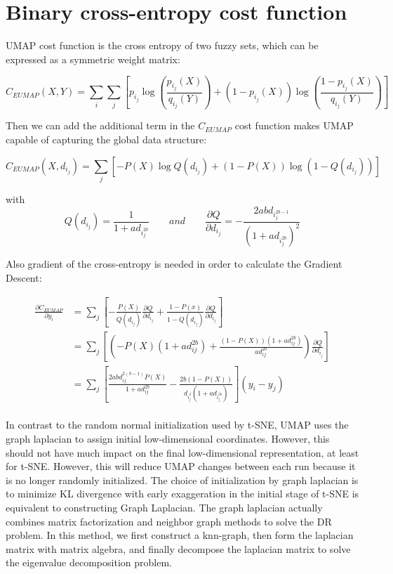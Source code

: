 \section{Binary cross-entropy cost function}

UMAP cost function is the cross entropy of two fuzzy sets, which can be expressed as a symmetric weight matrix:

\begin{equation*}
    C_{EUMAP}(X,Y) = \sum_{i} \sum _{j}[p_i_j \log(\frac{p_i_j(X)}{q_i_j(Y)}) + (1-p_i_j(X))\log (\frac{1-p_i_j(X)}{q_i_j(Y)})]
\end{equation*}

\noindent Then we can add the additional term in the $C_{EUMAP}$ cost function makes UMAP capable of capturing the global data structure:

\begin{equation*}
    C_{EUMAP}(X,d_i_j) = \sum _{j}[-P(X) \log Q(d_i_j) + (1 - P(X)) \log (1-Q(d_i_j))]
\end{equation*}

with \begin{equation*}
    Q(d_i_j) = \frac{1}{1+ad_i_j^{2b}}  \qquad and \qquad   \frac{\partial Q}{\partial d_i_j} = -\frac{2abd_i_j^{2b-1}}{(1+ad_i_j^{2b})^2}
\end{equation*}

\noindent Also gradient of the cross-entropy is needed in order to calculate the Gradient Descent:

\begin{equation*}
\begin{aligned}
\frac{\partial C_{EUMAP}}{\partial y_i}  &= \sum_j\left[- \frac{P(X)}{Q(d_i_j)} \frac{\partial Q}{\partial d_i_j} + \frac{1-P(x)}{1-Q(d_i_j)} \frac{\partial Q}{\partial d_i_j}\right]\\
&= \sum_j \left[ \left( -P(X)(1+ad_{ij}^{2b}) + \frac{(1-P(X))(1 + ad_{ij}^{2b})}{ad_{ij}^{2b}} \right) \frac{\partial Q}{\partial d_i_j}\right]\\
&= \sum_j \left[ \frac{2abd_{ij}^{2(b-1)}P(X)}{1 + ad_{ij}^{2b}} - \frac{2b(1-P(X))}{d_i_j^2(1+ad_i_j^{2b})} \right](y_i - y_j)
\end{aligned}
\end{equation*}\\

\noindent In contrast to the random normal initialization used by t-SNE, UMAP uses the graph laplacian to assign initial low-dimensional coordinates. However, this should not have much impact on the final low-dimensional representation, at least for t-SNE. However, this will reduce UMAP changes between each run because it is no longer randomly initialized. The choice of initialization by graph laplacian is to minimize KL divergence with early exaggeration in the initial stage of t-SNE is equivalent to constructing Graph Laplacian. The graph laplacian actually combines matrix factorization and neighbor graph methods to solve the DR problem. In this method, we first construct a knn-graph, then form the laplacian matrix with matrix algebra, and finally decompose the laplacian matrix to solve the eigenvalue decomposition problem.\\


